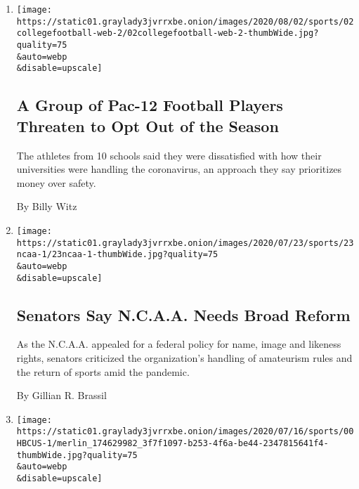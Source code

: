 \begin{enumerate}
\def\labelenumi{\arabic{enumi}.}
\item
  \href{/2020/08/02/sports/ncaafootball/coronavirus-college-football-pac-12.html}{}

  \texttt{[image: https://static01.graylady3jvrrxbe.onion/images/2020/08/02/sports/02collegefootball-web-2/02collegefootball-web-2-thumbWide.jpg?quality=75\\\&auto=webp\\\&disable=upscale]}

  \hypertarget{a-group-of-pac-12-football-players-threaten-to-opt-out-of-the-season}{%
  \subsection{A Group of Pac-12 Football Players Threaten to Opt Out of
  the
  Season}\label{a-group-of-pac-12-football-players-threaten-to-opt-out-of-the-season}}

  The athletes from 10 schools said they were dissatisfied with how
  their universities were handling the coronavirus, an approach they say
  prioritizes money over safety.

  By Billy Witz
\item
  \href{/2020/07/23/sports/ncaa-NIL-rights.html}{}

  \texttt{[image: https://static01.graylady3jvrrxbe.onion/images/2020/07/23/sports/23ncaa-1/23ncaa-1-thumbWide.jpg?quality=75\\\&auto=webp\\\&disable=upscale]}

  \hypertarget{senators-say-ncaa-needs-broad-reform}{%
  \subsection{Senators Say N.C.A.A. Needs Broad
  Reform}\label{senators-say-ncaa-needs-broad-reform}}

  As the N.C.A.A. appealed for a federal policy for name, image and
  likeness rights, senators criticized the organization's handling of
  amateurism rules and the return of sports amid the pandemic.

  By Gillian R. Brassil
\item
  \href{/2020/07/22/sports/ncaabasketball/black-lives-matter-hbcus-college-athletes.html}{}

  \texttt{[image: https://static01.graylady3jvrrxbe.onion/images/2020/07/16/sports/00HBCUS-1/merlin\_174629982\_3f7f1097-b253-4f6a-be44-2347815641f4-thumbWide.jpg?quality=75\\\&auto=webp\\\&disable=upscale]}

  \hypertarget{black-lives-matter-protests-spawn-push-for-athletes-to-attend-historically-black-colleges}{%
}
\end{enumerate}
